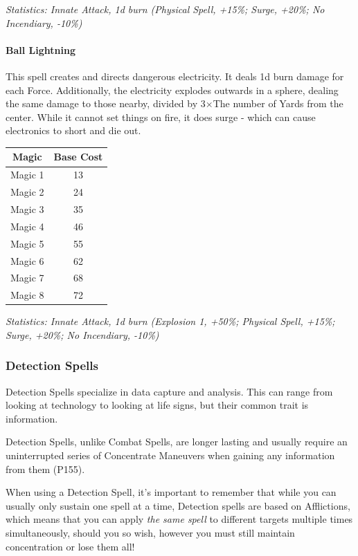 \begin{multicols*}{3}
	\textcolor{OliveGreen}{\textit{Statistics: Innate Attack, 1d burn (Physical Spell, +15\%; Surge, +20\%; No Incendiary, -10\%)}}
	
	\paragraph{Ball Lightning}
	
	This spell creates and directs dangerous electricity. It deals 1d burn damage for each Force. Additionally, the electricity explodes outwards in a sphere, dealing the same damage to those nearby, divided by 3\(\times\)The number of Yards from the center. While it cannot set things on fire, it does surge - which can cause electronics to short and die out.
	
	\begin{center}
		\begin{tabular}{|c|c|}
			\hline
			Magic & Base Cost \\
			\hline
			\hline
			Magic 1 & 13 \\
			Magic 2 & 24 \\
			Magic 3 & 35 \\
			Magic 4 & 46 \\
			Magic 5 & 55 \\
			Magic 6 & 62 \\
			Magic 7 & 68 \\
			Magic 8 & 72 \\
			\hline
		\end{tabular}
	\end{center}
	
	\textcolor{OliveGreen}{\textit{Statistics: Innate Attack, 1d burn (Explosion 1, +50\%; Physical Spell, +15\%; Surge, +20\%; No Incendiary, -10\%)}}
	
	\subsubsection{Detection Spells}
	
	Detection Spells specialize in data capture and analysis. This can range from looking at technology to looking at life signs, but their common trait is information.
	
	Detection Spells, unlike Combat Spells, are longer lasting and usually require an uninterrupted series of Concentrate Maneuvers when gaining any information from them (P155).
	
	When using a Detection Spell, it's important to remember that while you can usually only sustain one spell at a time, Detection spells are based on Afflictions, which means that you can apply \textit{the same spell} to different targets multiple times simultaneously, should you so wish, however you must still maintain concentration or lose them all!
	

\end{multicols*}
